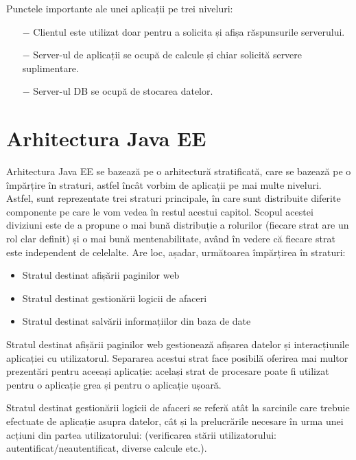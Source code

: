 Punctele importante ale unei aplicații pe trei niveluri:

\begin{itemize}
	\addtolength{\itemindent}{1cm}
	\item[$-$]Clientul este utilizat doar pentru a solicita și afișa răspunsurile serverului.
	\item[$-$]Server-ul de aplicații se ocupă de calcule și chiar solicită servere suplimentare.
	\item[$-$]Server-ul DB se ocupă de stocarea datelor.
	\newline
\end{itemize}

\section{Arhitectura Java EE}

Arhitectura Java EE se bazează pe o arhitectură stratificată, care se bazează pe o împărțire în straturi, astfel încât vorbim de aplicații pe mai multe niveluri. Astfel, sunt reprezentate trei straturi principale, în care sunt distribuite diferite componente pe care le vom vedea în restul acestui capitol.
Scopul acestei diviziuni este de a propune o mai bună distribuție a rolurilor (fiecare strat are un rol clar definit) și o mai bună mentenabilitate, având în vedere că fiecare strat este independent de celelalte.\newline
Are loc, așadar, următoarea împărțirea în straturi:

\begin{itemize}
	\item{Stratul destinat afișării paginilor web}
	\item{Stratul destinat gestionării logicii de afaceri}
	\item{Stratul destinat salvării informațiilor din baza de date}
	\newline
\end{itemize}

Stratul destinat afișării paginilor web gestionează afișarea datelor și interacțiunile aplicației cu utilizatorul. Separarea acestui strat face posibilă oferirea mai multor prezentări pentru aceeași aplicație: același strat de procesare poate fi utilizat pentru o aplicație grea și pentru o aplicație ușoară.\newline

Stratul destinat gestionării logicii de afaceri se referă atât la sarcinile care trebuie efectuate de aplicație asupra datelor, cât și la prelucrările necesare în urma unei acțiuni din partea utilizatorului: (verificarea stării utilizatorului: autentificat/neautentificat, diverse calcule etc.).\newline

